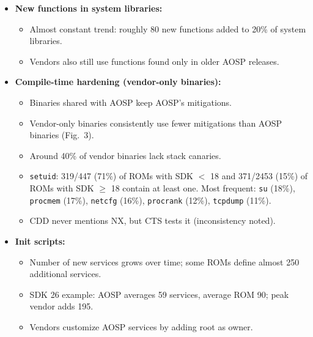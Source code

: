 \documentclass[11pt,a4paper]{article}
\begin{document}
\begin{enumerate}
\begin{itemize}[leftmargin=*,itemsep=1pt,topsep=2pt]
        \begin{itemize}[itemsep=0pt]
            \item 85 (43.37\%) disable CFI on at least one binary; 104 (53.06\%) disable IntSan.
            \item Six vendors lowered a binary's security vs.\ AOSP.
            \item Among violators, CFI disabled for 38.7\% ($\sigma$=36.5) and IntSan for 35.8\% ($\sigma$=34.9) of binaries.
        \end{itemize}
        \item \textbf{New functions in system libraries:}
        \begin{itemize}[itemsep=0pt]
            \item Almost constant trend: roughly 80 new functions added to 20\% of system libraries.
            \item Vendors also still use functions found only in older AOSP releases.
        \end{itemize}
        \item \textbf{Compile-time hardening (vendor-only binaries):}
        \begin{itemize}[itemsep=0pt]
            \item Binaries shared with AOSP keep AOSP's mitigations.
            \item Vendor-only binaries consistently use fewer mitigations than AOSP binaries (Fig.~3).
            \item Around 40\% of vendor binaries lack stack canaries.
            \item \texttt{setuid}: 319/447 (71\%) of ROMs with SDK $<$ 18 and 371/2453 (15\%) of ROMs with SDK $\geq$ 18 contain at least one. Most frequent: \texttt{su} (18\%), \texttt{procmem} (17\%), \texttt{netcfg} (16\%), \texttt{procrank} (12\%), \texttt{tcpdump} (11\%).
            \item CDD never mentions NX, but CTS tests it (inconsistency noted).
        \end{itemize}
        \item \textbf{Init scripts:}
        \begin{itemize}[itemsep=0pt]
            \item Number of new services grows over time; some ROMs define almost 250 additional services.
            \item SDK 26 example: AOSP averages 59 services, average ROM 90; peak vendor adds 195.
            \item Vendors customize AOSP services by adding root as owner.

\end{itemize}
\end{itemize}
\end{enumerate}
\end{document}
